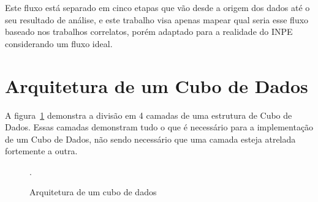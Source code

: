Este fluxo está separado em cinco etapas que vão desde a origem dos dados até o seu resultado de análise, e este trabalho visa apenas mapear qual seria esse fluxo baseado nos trabalhos correlatos, porém adaptado para a realidade do INPE considerando um fluxo ideal.

\section{Arquitetura de um Cubo de Dados}
\label{ch:prop:cubearch}

A figura~\ref{fig:cubearch} demonstra a divisão em 4 camadas de uma estrutura de Cubo de Dados. Essas camadas demonstram tudo o que é necessário para a implementação de um Cubo de Dados, não sendo necessário que uma camada esteja atrelada fortemente a outra.

\begin{figure}[ht]
	\caption{Arquitetura de um cubo de dados}
	\vspace{6mm}
	\begin{center}
	\end{center}
	\vspace{2mm}
	\legenda{}
	.
	\label{fig:cubearch}
\end{figure}

